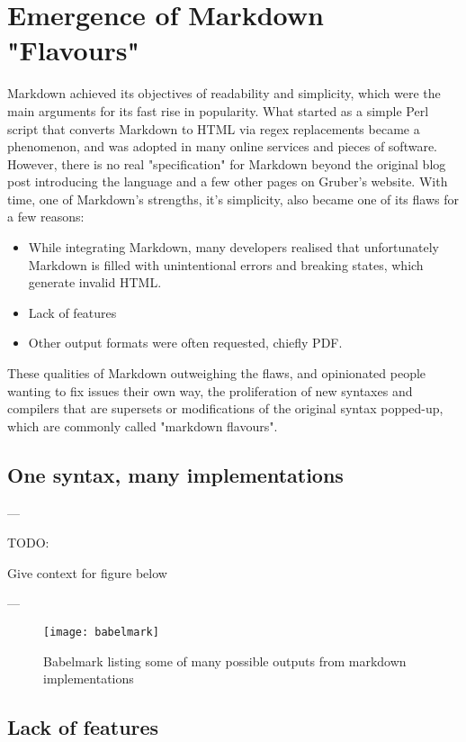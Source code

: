 \chapter{Emergence of Markdown "Flavours"}

Markdown achieved its objectives of readability and simplicity, which were the main arguments for its fast rise in popularity. What started as a simple Perl script that converts Markdown to HTML via regex replacements became a phenomenon, and was adopted in many online services and pieces of software.\\

However, there is no real "specification" for Markdown beyond the original blog post introducing the language and a few other pages on Gruber's website. With time, one of Markdown's strengths, it's simplicity, also became one of its flaws for a few reasons:

\begin{itemize}
    \item While integrating Markdown, many developers realised that unfortunately Markdown is filled with unintentional errors and breaking states, which generate invalid HTML.
    \item Lack of features
    \item Other output formats were often requested, chiefly PDF.
\end{itemize}

These qualities of Markdown outweighing the flaws, and opinionated people wanting to fix issues their own way, the proliferation of new syntaxes and compilers that are supersets or modifications of the original syntax popped-up, which are commonly called "markdown flavours".


\section{One syntax, many implementations}

---

TODO:

Give context for figure below

---

\begin{figure}[h]
\centering
\texttt{[image: babelmark]}
\caption{Babelmark listing some of many possible outputs from markdown implementations}
\end{figure}

\section{Lack of features}

